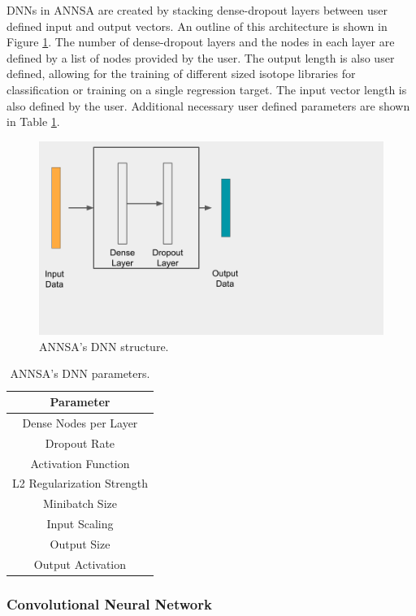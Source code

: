 DNNs in ANNSA are created by stacking dense-dropout layers between user defined input and output vectors. An outline of this architecture is shown in Figure \ref{fig:annsa_dnn}. The number of dense-dropout layers and the nodes in each layer are defined by a list of nodes provided by the user. The output length is also user defined, allowing for the training of different sized isotope libraries for classification or training on a single regression target. The input vector length is also defined by the user. Additional necessary user defined parameters are shown in Table \ref{table:annsa_dnn_params}.

\begin{figure}[H]
\centering
\includegraphics[trim=0 110 400 0,clip,width=0.6\linewidth]{images/annsa_dnn.png}
\caption{ANNSA's DNN structure.}
\label{fig:annsa_dnn}
\end{figure}

\begin{table}[H]
\centering
\caption{ANNSA's DNN parameters.}
\begin{tabular}{c}
\hline
Parameter \\ \hline
Dense Nodes per Layer \\
Dropout Rate \\
Activation Function \\
L2 Regularization Strength \\ 
Minibatch Size \\ 
Input Scaling \\
Output Size \\
Output Activation \\ \hline
\end{tabular}
\label{table:annsa_dnn_params}
\end{table}

\subsubsection{Convolutional Neural Network} \label{annsa_section_conv_neural_network}

